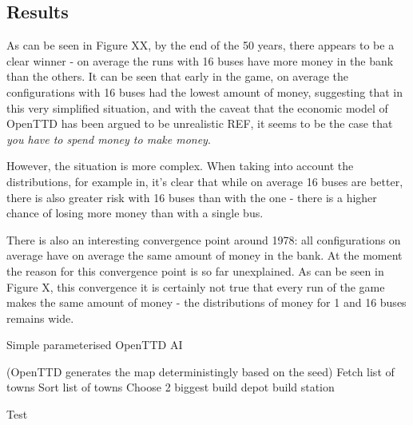 \documentclass[logo,msc,dsti]{infthesis}    %
\begin{document}
\subsection{Results}

As can be seen in Figure XX, by the end of the 50 years, there appears to be a clear winner - on average the runs with 16 buses have more money in the bank than the others. It can be seen that early in the game, on average the configurations with 16 buses had the lowest amount of money, suggesting that in this very simplified situation, and with the caveat that the economic model of OpenTTD has been argued to be unrealistic REF, it seems to be the case that \emph{you have to spend money to make money}.

However, the situation is more complex. When taking into account the distributions, for example in, it's clear that while on average 16 buses are better, there is also greater risk with 16 buses than with the one - there is a higher chance of losing more money than with a single bus.

There is also an interesting convergence point around 1978: all configurations on average have on average the same amount of money in the bank. At the moment the reason for this convergence point is so far unexplained. As can be seen in Figure X, this convergence it is certainly not true that every run of the game makes the same amount of money - the distributions of money for 1 and 16 buses remains wide.

\begin{algorithm}
\caption{Simple parameterised OpenTTD AI}\label{alg:three}
 (OpenTTD generates the map deterministingly based on the seed) \;
 Fetch list of towns \;
 Sort list of towns \;
 Choose 2 biggest \;
 build depot\;
 build station\;
\label{algorithm:simpleai}
\caption{Test}
\end{algorithm}
\end{document}
